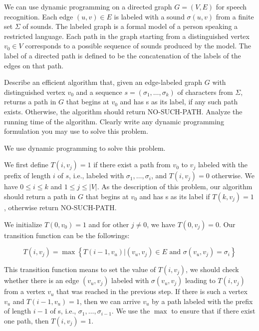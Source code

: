 \newpage
{} %

\problemdes

We can use dynamic programming on a directed graph $G = (V,E)$ for speech recognition. Each edge $(u, v) \in E$ is labeled with a sound $\sigma(u, v)$ from a finite set $\Sigma$ of sounds. The labeled graph is a formal model of a person speaking a restricted language. Each path in the graph starting from a distinguished vertex $v_0 \in V$ corresponds to a possible sequence of sounds produced by the model. The label of a directed path is defined to be the concatenation of the labels of the edges on that path.

Describe an efficient algorithm that, given an edge-labeled graph $G$ with distinguished vertex $v_0$ and a sequence $s = (\sigma_1, \dots, \sigma_k)$ of characters from $\Sigma$, returns a path in $G$ that begins at $v_0$ and has s as its label, if any such path exists. Otherwise, the algorithm should return NO-SUCH-PATH. Analyze the running time of the algorithm. Clearly write any dynamic programming formulation you may use to solve this problem.

\solution


We use dynamic programming to solve this problem. 

We first define $T(i, v_j) = 1$ if there exist a path from $v_0$ to $v_j$ labeled with the prefix of length $i$ of $s$, i.e., labeled with $\sigma_1, \dots, \sigma_i$, and $T(i, v_j) = 0$ otherwise. We have $0\leq i \leq k$ and $1\leq j \leq |V|$. As the description of this problem, our algorithm should return a path in $G$ that begins at $v_0$ and has s as its label if $T(k, v_j) = 1$, otherwise return NO-SUCH-PATH.

We initialize $T(0, v_0)=1$ and for other $j \neq 0$, we have  $T(0, v_j)=0$. Our transition function can be the followings:

$$T(i, v_j)=\max \left\{T(i-1, v_u) |(v_u, v_j) \in E \text { and } \sigma(v_u, v_j)=\sigma_i \right\}$$

This transition function means to set the value of $T(i, v_j)$, we should check whether there is an edge $(v_u, v_j)$ labeled with $\sigma(v_u, v_j)$ leading to $T(i, v_j)$ from a vertex $v_u$ that was reached in the previous step. If there is such a vertex $v_u$ and $T(i-1, v_u)=1$, then we can arrive $v_u$ by a path labeled with the prefix of length $i-1$ of s, i.e., $\sigma_1, \dots, \sigma_{i-1}$. We use the $\max$ to ensure that if there exist one path, then $T(i, v_j)=1$.

